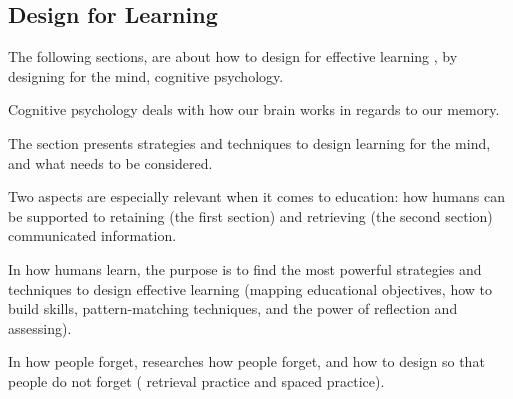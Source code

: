\subsection{Design for Learning}


The following sections, are about how to design for effective learning \citep{dirksen}, by designing for the mind, cognitive psychology. %

Cognitive psychology deals with how our brain works in regards to our memory.

The section presents strategies and techniques to design learning for the mind, and what needs to be considered.

Two aspects are especially relevant when it comes to education: how humans can be supported to retaining (the first section) and retrieving (the second section) communicated information.

In how humans learn, the purpose is to find the most powerful strategies and techniques to design effective learning (mapping educational objectives, how to build skills, pattern-matching techniques, and the power of reflection and assessing).

In how people forget, \cite{bjork} researches how people forget, and how to design so that people do not forget ( retrieval practice and spaced practice).





